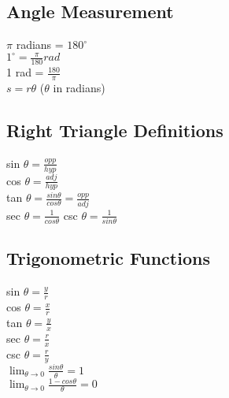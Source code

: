 \documentclass{article}
\begin{document}
	\subsection*{Angle Measurement}
		\begin{center}
		$\pi$ radians = $180^\circ$\\
		\vspace{10pt}
		$1^\circ = \frac{\pi}{180}rad$\\
		\vspace{10pt}
		1 rad = $\frac{180}{\pi}$\\
		\vspace{10pt}
		$s = r\theta$ ($\theta$ in radians)
		\end{center}
	\subsection*{Right Triangle Definitions}
		\begin{center}
		sin $\theta = \frac{opp}{hyp}$\\
		\vspace{10pt}
		cos $\theta = \frac{adj}{hyp}$\\
		\vspace{10pt}
		tan $\theta = \frac{sin \theta}{cos \theta} = \frac{opp}{adj}$\\
		\vspace{10pt}
		sec $\theta = \frac{1}{cos \theta}$ 
		\vspace{10pt}
		csc $\theta = \frac{1}{sin \theta}$
		\end{center}
	\subsection*{Trigonometric Functions}
		\begin{center}
		sin $\theta = \frac{y}{r}$\\
		\vspace{10pt}
		cos $\theta = \frac{x}{r}$\\
		\vspace{10pt}
		tan $\theta = \frac{y}{x}$\\
		\vspace{10pt}
		sec $\theta = \frac{r}{x}$\\
		\vspace{10pt}
		csc $\theta = \frac{r}{y}$\\
		\vspace{10pt}
		$\lim_{\theta \to 0} \frac{sin \theta}{\theta} = 1$\\
		\vspace{10pt}
		$\lim_{\theta \to 0} \frac{1 - cos \theta}{\theta} = 0$
		\end{center}
\end{document}
